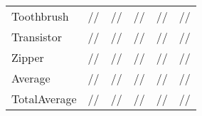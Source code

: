 \documentclass[lettersize,journal]{IEEEtran}
\begin{document}
\begin{table*}[htbp]
\begin{tabular}{lccccc}
    Toothbrush   & //                                          & //                                   & {\color{blue}{}}//{\color{blue}{}}                        & /{\color{blue}{}}/{\color{blue}{}}                          & {\color{red}{}}/{\color{red}{}}/{\color{red}{}}    \\
    Transistor   & //                                          & //                                  & {\color{blue}{}}//{\color{blue}{}}                        & /{\color{blue}{}}/{\color{red}{}}                           & {\color{red}{}}/{\color{red}{}}/{\color{blue}{}}   \\
    Zipper       & //                                         & //                                  & //                                                                          & {\color{blue}{}}/{\color{red}{}}/{\color{blue}{}}  & {\color{red}{}}/{\color{blue}{}}/{\color{red}{}}   \\\hline
    Average      & //                                         & //                                  & //                                                                          & {\color{blue}{}}/{\color{red}{}}/{\color{blue}{}}  & {\color{red}{}}/{\color{blue}{}}/{\color{red}{}}   \\\hline
    TotalAverage & //                                         & //                                  & //                                                                          & {\color{blue}{}}/{\color{blue}{}}/{\color{blue}{}} & {\color{red}{}}/{\color{red}{}}/{\color{red}{}}    \\
\bottomrule
  \end{tabular}
\end{table*}
\end{document}
